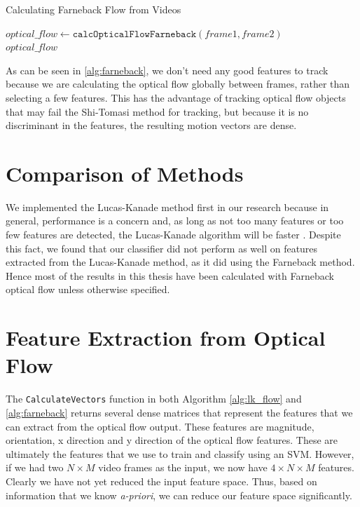 \begin{algorithm}
\caption{Calculating Farneback Flow from Videos}
\label{alg:farneback}
\begin{algorithmic}[1]
  \State $optical\_flow \gets \texttt{calcOpticalFlowFarneback}(frame1, frame2)$\\
  \Return $optical\_flow$
\EndProcedure
\end{algorithmic}
\end{algorithm}

As can be seen in \ref{alg:farneback}, we don't need any good features to track
because we are calculating the optical flow globally between frames, rather than
selecting a few features. This has the advantage of tracking optical flow objects
that may fail the Shi-Tomasi method for tracking, but because it is no discriminant
in the features, the resulting motion vectors are dense.


\section{\label{section:comparison}Comparison of Methods}
We implemented the Lucas-Kanade method first in our research because in general,
performance is a concern and, as long as not too many features or
too few features are detected, the Lucas-Kanade algorithm will be faster
\cite{de2015choosing}. Despite this fact, we found that our classifier did
not perform as well on features extracted from the Lucas-Kanade method, as it
did using the Farneback method. Hence most of the results in this thesis
have been calculated with Farneback optical flow unless otherwise specified.

\section{\label{section:feature_extraction}Feature Extraction from Optical Flow}
The \texttt{CalculateVectors} function in both Algorithm \ref{alg:lk_flow} and
\ref{alg:farneback} returns several dense matrices that represent the features
that we can extract from the optical flow output. These features are magnitude,
orientation, x direction and y direction of the optical flow features. These are
ultimately the features that we use to train and classify using an SVM. However,
if we had two $N \times M$ video frames as the input, we now have $4 \times N
\times M$ features. Clearly we have not yet reduced the input feature space.
Thus, based on information that we know \textit{a-priori}, we can reduce our
feature space significantly.


